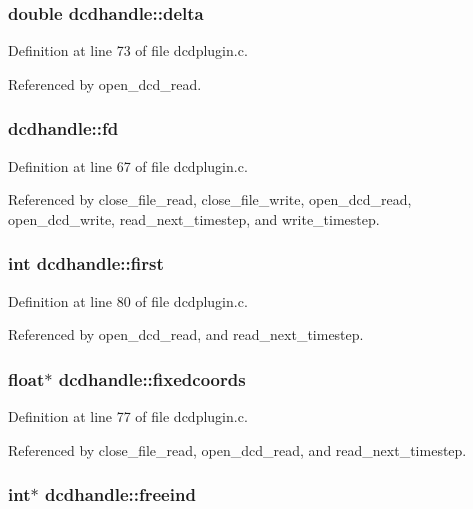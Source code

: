 \subsubsection{\setlength{\rightskip}{0pt plus 5cm}double dcdhandle::delta}\label{structdcdhandle_m6}




Definition at line 73 of file dcdplugin.c.

Referenced by open\_\-dcd\_\-read.
\subsubsection{ dcdhandle::fd}\label{structdcdhandle_m0}




Definition at line 67 of file dcdplugin.c.

Referenced by close\_\-file\_\-read, close\_\-file\_\-write, open\_\-dcd\_\-read, open\_\-dcd\_\-write, read\_\-next\_\-timestep, and write\_\-timestep.
\subsubsection{\setlength{\rightskip}{0pt plus 5cm}int dcdhandle::first}\label{structdcdhandle_m15}




Definition at line 80 of file dcdplugin.c.

Referenced by open\_\-dcd\_\-read, and read\_\-next\_\-timestep.
\subsubsection{\setlength{\rightskip}{0pt plus 5cm}float$\ast$ dcdhandle::fixedcoords}\label{structdcdhandle_m12}




Definition at line 77 of file dcdplugin.c.

Referenced by close\_\-file\_\-read, open\_\-dcd\_\-read, and read\_\-next\_\-timestep.
\subsubsection{\setlength{\rightskip}{0pt plus 5cm}int$\ast$ dcdhandle::freeind}\label{structdcdhandle_m11}




